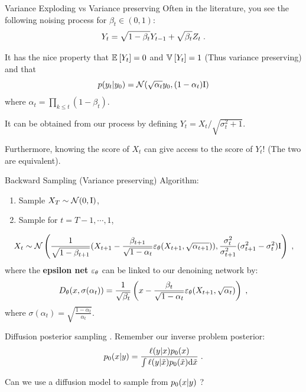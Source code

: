 \documentclass[10pt]{beamer}
\begin{document}
\begin{frame}{Variance Exploding vs Variance preserving}
  Often in the literature, you see the following noising process for $\beta_t \in (0, 1)$:
  \begin{equation}
    Y_t = \sqrt{1 - \beta_t} Y_{t-1} + \sqrt{\beta_t} Z_{t} \;.
  \end{equation}

  It has the nice property that $\mathbb{E}_{}\left[Y_t\right] = 0$ and $\mathbb{V}_{}\left[Y_t\right] = 1$ (Thus variance preserving) and that
  $$p(y_t | y_0) = \mathcal{N}(\sqrt{\alpha_t} y_0, (1 - \alpha_t) \mathrm{I})$$ where $\alpha_t = \prod_{k\leq t} (1 - \beta_t)$.

  \pause
  It can be obtained from our process by defining $Y_{t} = X_{t} / \sqrt{\sigma_t^2 + 1}$. 


  Furthermore, knowing the score of $X_t$ can give access to the score of $Y_{t}$! (The two are equivalent).

\end{frame}
\begin{frame}{Backward Sampling (Variance preserving)}
  Algorithm:
  \begin{enumerate}
    \item Sample $X_T \sim \mathcal{N}(0, \mathrm{I})$,
    \item Sample for $t = T-1, \cdots, 1$,
  \end{enumerate}
  $$X_{t} \sim \mathcal{N}\left(\frac{1}{\sqrt{1-\beta_{t+1}}}(X_{t+1} - \frac{\beta_{t+1}}{\sqrt{1 - \alpha_t}} \varepsilon_{\theta}(X_{t+1}, \sqrt{\alpha_{t+1}})),  \frac{\sigma_t^2}{\sigma_{t+1}^2}(\sigma_{t+1}^2 - \sigma_{t}^2)\mathrm{I}\right) \;,$$
  where the \textbf{epsilon net} $\varepsilon_{\theta}$ can be linked to our denoining network by:
  $$D_{\theta}(x, \sigma(\alpha_t)) = \frac{1}{\sqrt{\beta_t}}\left(x - \frac{\beta_t}{\sqrt{1 - \alpha_t}} \varepsilon_{\theta}(X_{t+1}, \sqrt{\alpha_t})\right) \;,$$
  where $\sigma(\alpha_t) = \sqrt{\frac{1 - \alpha_t}{\alpha_t}}$.
\end{frame}
\begin{frame}{Diffusion posterior sampling \citep{chung2023diffusion}.}
    Remember our inverse problem posterior:
    \begin{equation}
      p_{0}(x | y) = \frac{\ell(y | x) p_{0}(x)}{\int \ell(y | \tilde{x}) p_{0}(\tilde{x}) \mathrm{d} \tilde{x}} \;.
    \end{equation}
    \pause

    Can we use a diffusion model to sample from $p_{0}(x | y)$ ?
\end{frame}
\end{document}
